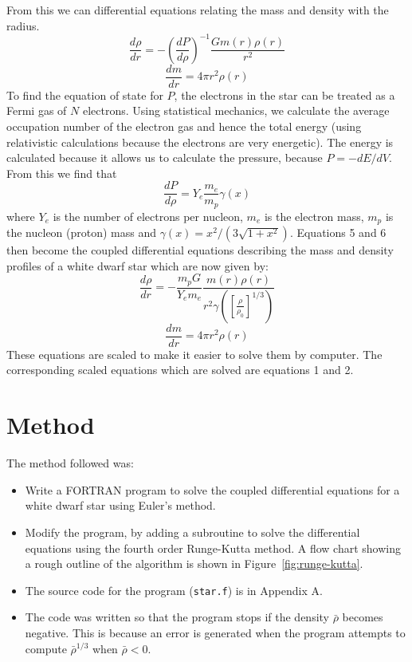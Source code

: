 \documentclass[a4paper]{IEEEtran}
\begin{document}
From this we can differential equations relating the mass and density
with the radius.
\begin{equation}
    \frac{d\rho}{dr} = -\left(\frac{dP}{d\rho}\right)^{-1}\frac{Gm(r)\rho(r)}{r^2}
\end{equation}
\begin{equation}
    \frac{dm}{dr} = 4\pi r^2 \rho(r)
\end{equation}
To find the equation of state for $P$, the electrons in the star can
be treated as a Fermi gas of $N$ electrons. Using statistical mechanics,
we calculate the average occupation number of the electron gas and hence
the total energy (using relativistic calculations because the electrons
are very energetic). The energy is calculated because it allows us to
calculate the pressure, because $P = -dE/dV$.
From this we find that
\begin{equation}
    \frac{dP}{d\rho} = Y_e \frac{m_e}{m_p} \gamma(x)
\end{equation}
where $Y_e$ is the number of electrons per nucleon, $m_e$ is the electron
mass, $m_p$ is the nucleon (proton) mass and $\gamma(x) = x^2/(3\sqrt{1+x^2})$.
Equations 5 and 6 then become the coupled differential equations describing the
mass and density profiles of a white dwarf star which are now given by:
\begin{equation}
    \frac{d\rho}{dr} = -\frac{m_p G}{Y_e m_e} %
                        \frac{m(r)\rho(r)}{r^2 \gamma([ \frac{\rho}{\rho_0}]^{1/3}) }
\end{equation}
\begin{equation}
    \frac{dm}{dr} = 4\pi r^2 \rho(r)
\end{equation}
These equations are scaled to make it easier to solve them by computer. 
The corresponding scaled equations which are solved are equations 1 and 2.




\section{Method}
    The method followed was:
    \begin{itemize}
        \item Write a FORTRAN program to solve the 
              coupled differential equations for a white
              dwarf star using Euler's method.
        \item Modify the program, by adding a subroutine to solve
              the differential equations using the fourth order 
              Runge-Kutta method. A flow chart showing a rough outline
              of the algorithm is shown in Figure~\ref{fig:runge-kutta}.
        \item The source code for the program (\texttt{star.f}) is
              in Appendix A.
        \item The code was written so that the program stops if
              the density $\bar{\rho}$ becomes negative. This is
              because an error is generated when the program attempts
              to compute $\bar{\rho}^{1/3}$ when $\bar{\rho} < 0$. 
    \end{itemize}
\end{document}
